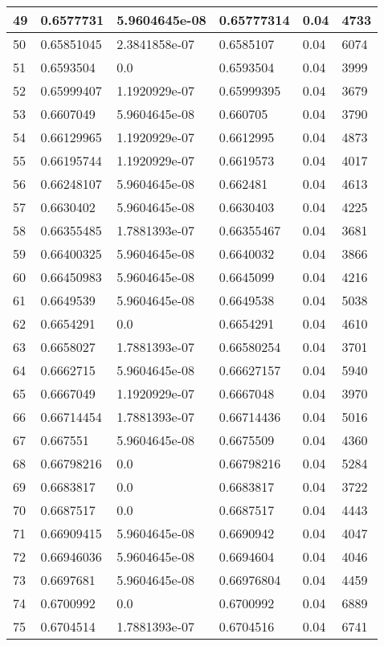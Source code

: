 \begin{longtable}{|l|l|l|l|l|l|}
49 & 0.6577731 & 5.9604645e-08 & 0.65777314 & 0.04 & 4733 \\ \hline 
50 & 0.65851045 & 2.3841858e-07 & 0.6585107 & 0.04 & 6074 \\ \hline 
51 & 0.6593504 & 0.0 & 0.6593504 & 0.04 & 3999 \\ \hline 
52 & 0.65999407 & 1.1920929e-07 & 0.65999395 & 0.04 & 3679 \\ \hline 
53 & 0.6607049 & 5.9604645e-08 & 0.660705 & 0.04 & 3790 \\ \hline 
54 & 0.66129965 & 1.1920929e-07 & 0.6612995 & 0.04 & 4873 \\ \hline 
55 & 0.66195744 & 1.1920929e-07 & 0.6619573 & 0.04 & 4017 \\ \hline 
56 & 0.66248107 & 5.9604645e-08 & 0.662481 & 0.04 & 4613 \\ \hline 
57 & 0.6630402 & 5.9604645e-08 & 0.6630403 & 0.04 & 4225 \\ \hline 
58 & 0.66355485 & 1.7881393e-07 & 0.66355467 & 0.04 & 3681 \\ \hline 
59 & 0.66400325 & 5.9604645e-08 & 0.6640032 & 0.04 & 3866 \\ \hline 
60 & 0.66450983 & 5.9604645e-08 & 0.6645099 & 0.04 & 4216 \\ \hline 
61 & 0.6649539 & 5.9604645e-08 & 0.6649538 & 0.04 & 5038 \\ \hline 
62 & 0.6654291 & 0.0 & 0.6654291 & 0.04 & 4610 \\ \hline 
63 & 0.6658027 & 1.7881393e-07 & 0.66580254 & 0.04 & 3701 \\ \hline 
64 & 0.6662715 & 5.9604645e-08 & 0.66627157 & 0.04 & 5940 \\ \hline 
65 & 0.6667049 & 1.1920929e-07 & 0.6667048 & 0.04 & 3970 \\ \hline 
66 & 0.66714454 & 1.7881393e-07 & 0.66714436 & 0.04 & 5016 \\ \hline 
67 & 0.667551 & 5.9604645e-08 & 0.6675509 & 0.04 & 4360 \\ \hline 
68 & 0.66798216 & 0.0 & 0.66798216 & 0.04 & 5284 \\ \hline 
69 & 0.6683817 & 0.0 & 0.6683817 & 0.04 & 3722 \\ \hline 
70 & 0.6687517 & 0.0 & 0.6687517 & 0.04 & 4443 \\ \hline 
71 & 0.66909415 & 5.9604645e-08 & 0.6690942 & 0.04 & 4047 \\ \hline 
72 & 0.66946036 & 5.9604645e-08 & 0.6694604 & 0.04 & 4046 \\ \hline 
73 & 0.6697681 & 5.9604645e-08 & 0.66976804 & 0.04 & 4459 \\ \hline 
74 & 0.6700992 & 0.0 & 0.6700992 & 0.04 & 6889 \\ \hline 
75 & 0.6704514 & 1.7881393e-07 & 0.6704516 & 0.04 & 6741 \\ \hline 
\end{longtable}